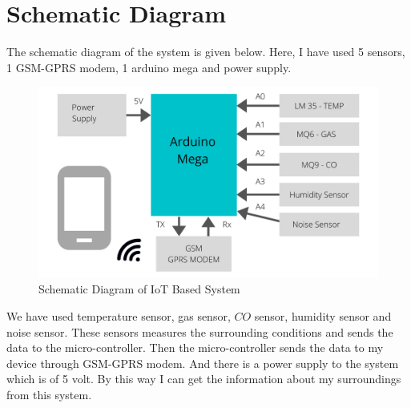 \chapter{Schematic Diagram}
The schematic diagram of the system is given below. Here, I have used 5 sensors, 1 GSM-GPRS modem, 1 arduino mega and power supply.
\begin{figure}[hbt!]
 \centering
 \includegraphics[width=17cm]{title/LM 35 -TEMP.png}
 \caption[]{Schematic Diagram of IoT Based System}
    \label{}
\end{figure}
We have used temperature sensor, gas sensor, $CO$ sensor, humidity sensor and noise sensor.\cite{WinNT} These sensors measures the surrounding conditions and sends the data to the micro-controller. Then the micro-controller sends the data to my device through GSM-GPRS modem. And there is a power supply to the system which is of 5 volt. By this way I can get the information about my surroundings from this system. 